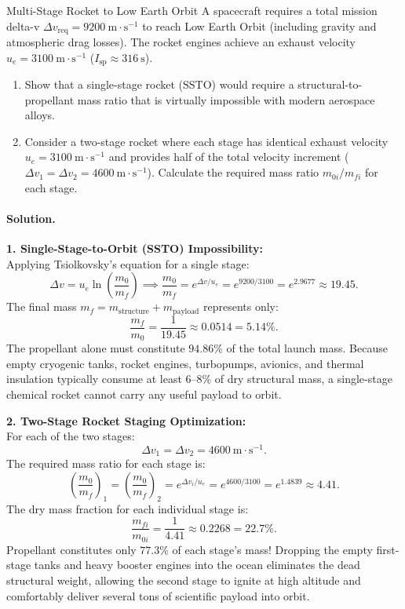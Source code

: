 \begin{workedexample}{Multi-Stage Rocket to Low Earth Orbit}
A spacecraft requires a total mission delta-v $\Delta v_{\text{req}} = 9200\ \mathrm{m\cdot s^{-1}}$ to reach Low Earth Orbit (including gravity and atmospheric drag losses). The rocket engines achieve an exhaust velocity $u_e = 3100\ \mathrm{m\cdot s^{-1}}$ ($I_{\text{sp}} \approx 316\ \mathrm{s}$).
\begin{enumerate}[leftmargin=1.4em,itemsep=3pt]
  \item Show that a single-stage rocket (SSTO) would require a structural-to-propellant mass ratio that is virtually impossible with modern aerospace alloys.
  \item Consider a two-stage rocket where each stage has identical exhaust velocity $u_e = 3100\ \mathrm{m\cdot s^{-1}}$ and provides half of the total velocity increment ($\Delta v_1 = \Delta v_2 = 4600\ \mathrm{m\cdot s^{-1}}$). Calculate the required mass ratio $m_{0i}/m_{fi}$ for each stage.
\end{enumerate}

\paragraph{Solution.}
\textbf{1. Single-Stage-to-Orbit (SSTO) Impossibility:}\\
Applying Tsiolkovsky's equation for a single stage:
\[
\Delta v = u_e \ln\left(\frac{m_0}{m_f}\right) \implies \frac{m_0}{m_f} = e^{\Delta v / u_e} = e^{9200 / 3100} = e^{2.9677} \approx 19.45.
\]
The final mass $m_f = m_{\text{structure}} + m_{\text{payload}}$ represents only:
\[
\frac{m_f}{m_0} = \frac{1}{19.45} \approx 0.0514 = 5.14\%.
\]
The propellant alone must constitute $94.86\%$ of the total launch mass. Because empty cryogenic tanks, rocket engines, turbopumps, avionics, and thermal insulation typically consume at least $6\text{--}8\%$ of dry structural mass, a single-stage chemical rocket cannot carry any useful payload to orbit.

\textbf{2. Two-Stage Rocket Staging Optimization:}\\
For each of the two stages:
\[
\Delta v_1 = \Delta v_2 = 4600\ \mathrm{m\cdot s^{-1}}.
\]
The required mass ratio for each stage is:
\[
\left(\frac{m_0}{m_f}\right)_1 = \left(\frac{m_0}{m_f}\right)_2 = e^{\Delta v_i / u_e} = e^{4600 / 3100} = e^{1.4839} \approx 4.41.
\]
The dry mass fraction for each individual stage is:
\[
\frac{m_{fi}}{m_{0i}} = \frac{1}{4.41} \approx 0.2268 = 22.7\%.
\]
Propellant constitutes only $77.3\%$ of each stage's mass! Dropping the empty first-stage tanks and heavy booster engines into the ocean eliminates the dead structural weight, allowing the second stage to ignite at high altitude and comfortably deliver several tons of scientific payload into orbit.
\end{workedexample}

